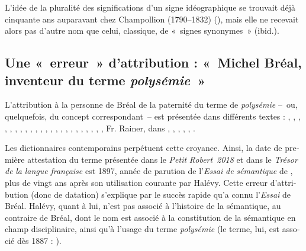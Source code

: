 \documentclass[french,output=paper,colorlinks,citecolor=brown]{../langscibook}
\begin{document}
\begin{otherlanguage}{french}
L’idée de la pluralité des significations d’un signe idéographique se trouvait déjà cinquante ans auparavant chez Champollion (1790--1832) (\citeyear[311--312]{Champollion1828}), mais elle ne recevait alors pas d’autre nom que celui, classique, de «~signes synonymes~» (ibid.).

\subsection{Une «~erreur~» d’attribution : «~Michel Bréal, inventeur du terme \textit{polysémie~}»}

L’attribution à la personne de Bréal de la paternité du terme de \textit{polysémie}  –~ou, quelquefois, du concept correspondant~– est présentée dans différents textes : \citet[15]{Firth1957Semantics}, \citet[199]{Ullmann1952}, \citet[147]{Ricoeur1975}, \citet[286]{DelesalleChevalier1986}, \textcites[89]{Delesalle1986}[300--305]{Delesalle1987}, \textcites[22]{Nerlich1993}[1625]{Nerlich2001Change}, \citet[169--170]{PeetersEiszele1993}, \citet{Peeters1994}, \citet[27]{DesmetSwiggers1995}, \citet[118]{Branca-Rosoff1996}, \citet[11]{VictorriFuchs1996}, \citet[16]{Surcin1999}, \citet[215]{AurouxDelesalle2000}, \citet[156]{Siblot2000}, \citet[4]{NerlichClarke2003}, \citet[131]{Girardin2004}, \citet[51]{Piron2006}, \citet[55]{Cusimano2008}, \citet[22]{Larrivee2008}, \citet[116]{Thibault2009}, \citet[10]{Mazaleyrat2010}, \citet[23]{Pauly2010}, \citet[n. p.]{Jakimovska2012}, Fr. Rainer, dans \citet{LieberStekauer2014}, \citet[59]{Derradji2014}, \citet[6]{SorbaCusimano2014}, \citet[23]{BiscontiDe-Mauro2016}, \citet[4]{Bruns2016}, \citet[103]{De-Palo2016French}.

Les dictionnaires contemporains perpétuent cette croyance. Ainsi, la date de première attestation du terme présentée dans le \textit{Petit} \textit{Robert~2018} et dans le \textit{Trésor} \textit{de} \textit{la} \textit{langue} \textit{française} est 1897, année de parution de l’\textit{Essai} \textit{de} \textit{sémantique} de \citet{Bréal1897}, plus de vingt ans après son utilisation courante par Halévy. Cette erreur d’attribution (donc de datation) s’explique par le succès rapide qu’a connu l’\textit{Essai} de Bréal. Halévy, quant à lui, n’est pas associé à l’histoire de la sémantique, au contraire de Bréal, dont le nom est associé à la constitution de la sémantique en champ disciplinaire, ainsi qu’à l’usage du terme \textit{polysémie} (le terme, lui, est associé dès 1887 : \citealt{Baale1887}).


\end{otherlanguage}
\end{document}
